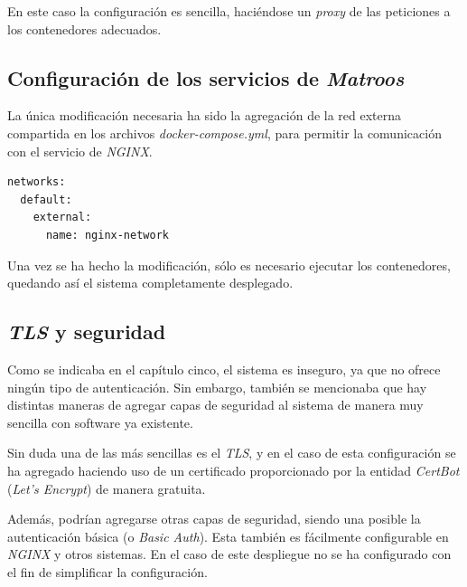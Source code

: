 En este caso la configuración es sencilla, haciéndose un \textit{proxy} de las peticiones a los contenedores adecuados.


\subsection{Configuración de los servicios de \textit{Matroos}}

La única modificación necesaria ha sido la agregación de la red externa compartida en los archivos \textit{docker-compose.yml}, para permitir la comunicación con el servicio de \textit{NGINX}.

\begin{lstlisting}[language=sh]
networks:
  default:
    external:
      name: nginx-network
\end{lstlisting}

Una vez se ha hecho la modificación, sólo es necesario ejecutar los contenedores, quedando así el sistema completamente desplegado.

\subsection{\textit{TLS} y seguridad}

Como se indicaba en el capítulo cinco, el sistema es inseguro, ya que no ofrece ningún tipo de autenticación. Sin embargo, también se mencionaba que hay distintas maneras de agregar capas de seguridad al sistema de manera muy sencilla con software ya existente.

Sin duda una de las más sencillas es el \textit{TLS}, y en el caso de esta configuración se ha agregado haciendo uso de un certificado proporcionado por la entidad \textit{CertBot} (\textit{Let's Encrypt}) de manera gratuita.

Además, podrían agregarse otras capas de seguridad, siendo una posible la autenticación básica (o \textit{Basic Auth}). Esta también es fácilmente configurable en \textit{NGINX} y otros sistemas. En el caso de este despliegue no se ha configurado con el fin de simplificar la configuración.

